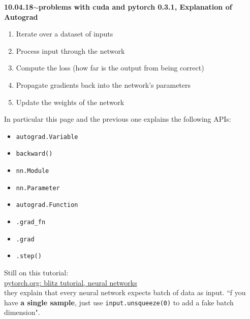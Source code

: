 \documentclass[11pt,a4paper]{article}
\newenvironment{loggentry}[2]%
{\noindent\textbf{#1}\hspace{1cm}$\mathbf{\sim}$\text{ }\textbf{#2}\\}{\vspace{0.5cm}}
\begin{document}
\begin{loggentry}{10.04.18}{problems with cuda and pytorch 0.3.1, Explanation of Autograd}
\begin{enumerate}
\item Iterate over a dataset of inputs
\item Process input through the network
\item Compute the loss (how far is the output from being correct)
\item Propagate gradients back into the network’s parameters
\item Update the weights of the network
\end{enumerate}
In particular this page and the previous one explains the following APIs:
\begin{itemize}
\item \texttt{autograd.Variable}
\item \texttt{backward()}
\item \texttt{nn.Module}
\item \texttt{nn.Parameter}
\item \texttt{autograd.Function}
\item \texttt{.grad\_fn}
\item \texttt{.grad}
\item \texttt{.step()}
\end{itemize}
Still on this tutorial:\\
\href{http://pytorch.org/tutorials/beginner/blitz/neural_networks_tutorial.html}{pytorch.org: blitz tutorial, neural networks}\\
they explain that every neural network expects batch of data as input. ``f you have \textbf{a single sample}, just use \texttt{input.unsqueeze(0)} to add a fake batch dimension". 
\end{loggentry}
\end{document}
